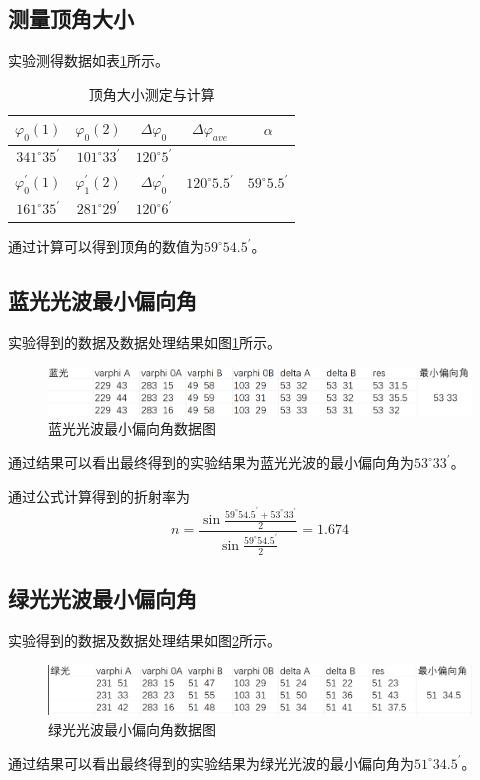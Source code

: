 \documentclass{ctexart}
\begin{document}
  \subsection{测量顶角大小}
  实验测得数据如表\ref{dingjiaoshujv}所示。
  \begin{table}[H]
    \centering   
    \caption{顶角大小测定与计算}\label{dingjiaoshujv}
    \begin{tabular}{||c|c|c|c|c||}
      \hline
      \hline
      $\varphi_{0}(1)$ & $\varphi_{0}(2)$ & $\Delta\varphi_{0}$ & $\Delta\varphi_{ave}$ & $\alpha$\\
      \hline
      $341^{\circ}35^{'}$ & $101^{\circ}33^{'}$ & $120^{\circ}5^{'}$ & \multirow{3}{*}{$120^{\circ}5.5^{'}$} & \multirow{3}{*}{$59^{\circ}5.5^{'}$}\\
      \cline{1-3}
      $\varphi_{0}^{'}(1)$ & $\varphi_{1}^{'}(2)$ & $\Delta\varphi_{0}^{'}$ & & \\
      \cline{1-3}
      $161^{\circ}35^{'}$ & $281^{\circ}29^{'}$ & $120^{\circ}6^{'}$ & & \\
      \hline
      \hline
    \end{tabular}
  \end{table}
  通过计算可以得到顶角的数值为$59^{\circ}54.5^{'}$。

  \subsection{蓝光光波最小偏向角}
  实验得到的数据及数据处理结果如图\ref{lanpianjiao}所示。
  \begin{figure}[H]
    \centering
    \includegraphics[height=0.1\textwidth,width=1\textwidth]{lanpianjiao.png}
    \caption{蓝光光波最小偏向角数据图}\label{lanpianjiao}
  \end{figure}
  通过结果可以看出最终得到的实验结果为蓝光光波的最小偏向角为$53^{\circ}33^{'}$。

  通过公式计算得到的折射率为
  \begin{equation}
    n=\frac{\sin\frac{59^{\circ}54.5^{'}+53^{\circ}33^{'}}{2}}{\sin\frac{59^{\circ}54.5^{'}}{2}}=1.674
  \end{equation}

  \subsection{绿光光波最小偏向角}
  实验得到的数据及数据处理结果如图\ref{lvpianjiao}所示。
  \begin{figure}[H]
    \centering
    \includegraphics[height=0.1\textwidth,width=1\textwidth]{lvpianjiao.png}
    \caption{绿光光波最小偏向角数据图}\label{lvpianjiao}
  \end{figure}
  通过结果可以看出最终得到的实验结果为绿光光波的最小偏向角为$51^{\circ}34.5^{'}$。
\end{document}
